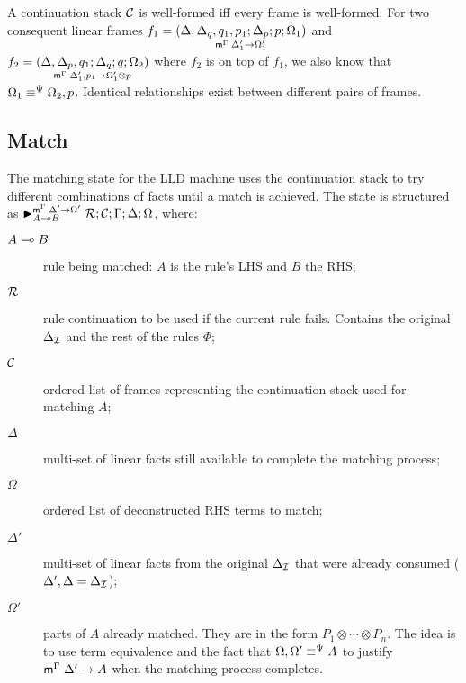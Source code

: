 \begin{definition}
A continuation stack $\lstack{C}$ is well-formed iff every frame is well-formed.
For two consequent linear frames $f_1 = \lframe{\Delta, \Delta_q, q_1,
p_1}{\Delta_p}{p}{\Omega_1}{\Delta'_1}{\Omega'_1}$ and $f_2 = \lframe{\Delta,
\Delta_p, q_1}{\Delta_q}{q}{\Omega_2}{\Delta'_1, p_1}{\Omega'_1 \otimes p}$
where $f_2$ is on top of $f_1$, we also know that $\feqa{\Omega_1}{\Omega_2,
p}{\Psi}{\Psi}$.
Identical relationships exist between different pairs of frames.
\end{definition}

\subsection{Match}\label{sec:lld_body_match}

The matching state for the LLD machine uses the continuation stack to try
different combinations of facts until a match is achieved.  The state is
structured as $\matstate{A \lolli
   B}{\rulestk}{\lstack{C}}{\Gamma}{\Delta}{\Omega}{\Delta' \rightarrow
      \Omega'}$, where:

\begin{description}
   \item[$A \lolli B$] rule being matched: $A$ is the rule's LHS and $B$ the RHS;

   \item[$\rulestk$] rule continuation to be used if the current rule fails.
   Contains the original $\deltan$ and the rest of the rules $\Phi$;

   \item[$\lstack{C}$] ordered list of frames representing the continuation
   stack used for matching $A$;

   \item[$\Delta$] multi-set of linear facts still available to complete the
   matching process;

   \item[$\Omega$] ordered list of deconstructed RHS terms to match;

   \item[$\Delta'$] multi-set of linear facts from the original $\deltan$ that
   were already consumed ($\Delta', \Delta = \deltan$);

   \item[$\Omega'$] parts of $A$ already matched. They are in the form $P_1
   \otimes \dotsb \otimes P_n$. The idea is to use term equivalence and the fact
   that $\feqa{\Omega, \Omega'}{A}{\Psi}{\cdot}$ to justify $\mz{\Gamma}{\Delta'}{A}$ when the
   matching process completes.

\end{description}

